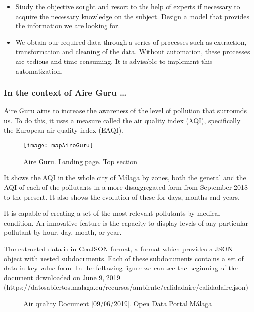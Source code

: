 \begin{itemize}
    \item Study the objective sought and resort to the help of experts if necessary to acquire the necessary knowledge on the subject.
    Design a model that provides the information we are looking for.

    \item We obtain our required data through a series of processes such as extraction, transformation and cleaning of the data.
    Without automation, these processes are tedious and time consuming.
    It is advisable to implement this automatization.
\end{itemize}

\subsubsection*{In the context of Aire Guru \ldots} 

Aire Guru aims to increase the awareness of the level of pollution that surrounds us.
To do this, it uses a measure called the air quality index (AQI), specifically the European air quality index (EAQI).

\begin{figure}[ht]
    \centering
    \texttt{[image: mapAireGuru]}
    \caption{Aire Guru. Landing page. Top section}
\end{figure}

It shows the AQI in the whole city of Málaga by zones, both the general and the AQI of each of the pollutants in a more disaggregated form from September 2018 to the present.
It also shows the evolution of these for days, months and years.

It is capable of creating a set of the most relevant pollutants by medical condition.
An innovative feature is the capacity to display levels of any particular pollutant by hour, day, month, or year. 

The extracted data is in GeoJSON format, a format which provides a JSON object with nested subdocuments.
Each of these subdocuments contains a set of data in key-value form.
In the following figure we can see the beginning of the document downloaded on June 9, 2019 (https://datosabiertos.malaga.eu/recursos/ambiente/calidadaire/calidadaire.json) \\

\begin{figure}[ht]
    \centering
    \hfill
    \caption{Air quality Document [09/06/2019]. Open Data Portal Málaga}
\end{figure}
    
